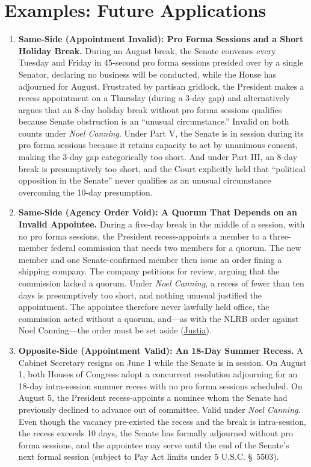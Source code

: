 \documentclass[12pt]{article}
\begin{document}
\section{Examples: Future Applications}
\begin{enumerate}

\item \textbf{Same-Side (Appointment Invalid): Pro Forma Sessions and a Short Holiday Break.} During an August break, the Senate convenes every Tuesday and Friday in 45-second pro forma sessions presided over by a single Senator, declaring no business will be conducted, while the House has adjourned for August. Frustrated by partisan gridlock, the President makes a recess appointment on a Thursday (during a 3-day gap) and alternatively argues that an 8-day holiday break without pro forma sessions qualifies because Senate obstruction is an ``unusual circumstance.'' Invalid on both counts under \emph{Noel Canning}. Under Part V, the Senate is in session during its pro forma sessions because it retains capacity to act by unanimous consent, making the 3-day gap categorically too short. And under Part III, an 8-day break is presumptively too short, and the Court explicitly held that ``political opposition in the Senate'' never qualifies as an unusual circumstance overcoming the 10-day presumption.

\item \textbf{Same-Side (Agency Order Void): A Quorum That Depends on an Invalid Appointee.} During a five-day break in the middle of a session, with no pro forma sessions, the President recess-appoints a member to a three-member federal commission that needs two members for a quorum. The new member and one Senate-confirmed member then issue an order fining a shipping company. The company petitions for review, arguing that the commission lacked a quorum. Under \textit{Noel Canning}, a recess of fewer than ten days is presumptively too short, and nothing unusual justified the appointment. The appointee therefore never lawfully held office, the commission acted without a quorum, and---as with the NLRB order against Noel Canning---the order must be set aside (\href{https://supreme.justia.com/cases/federal/us/573/513/}{Justia}).

\item \textbf{Opposite-Side (Appointment Valid): An 18-Day Summer Recess.} A Cabinet Secretary resigns on June 1 while the Senate is in session. On August 1, both Houses of Congress adopt a concurrent resolution adjourning for an 18-day intra-session summer recess with no pro forma sessions scheduled. On August 5, the President recess-appoints a nominee whom the Senate had previously declined to advance out of committee. Valid under \emph{Noel Canning}. Even though the vacancy pre-existed the recess and the break is intra-session, the recess exceeds 10 days, the Senate has formally adjourned without pro forma sessions, and the appointee may serve until the end of the Senate's next formal session (subject to Pay Act limits under 5 U.S.C. \S~5503).


\end{enumerate}
\end{document}
